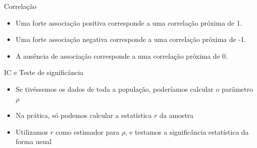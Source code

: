 \documentclass{beamer}
\begin{document}

\begin{frame}{Correlação}
  \begin{block}{}
    \begin{itemize}
    \item Uma forte associação \alert<2>{positiva} corresponde a uma correlação
      próxima de \alert<2>{1}.
    \item Uma forte associação \alert<3>{negativa} corresponde a uma correlação
      próxima de \alert<3>{-1}.
    \item A \alert<4>{ausência} de associação corresponde a uma
      correlação próxima de \alert<4>{0}.
    \end{itemize}
  \end{block}
\end{frame}

\begin{frame}{IC e Teste de significância}
  \begin{itemize}
  \item Se tivéssemos os dados de toda a \alert<1>{população}, poderíamos
    calcular o \alert<1>{parâmetro} $\rho$
  \item Na prática, só podemos calcular a \alert<2>{estatística} $r$ da \alert<2>{amostra}
  \item Utilizamos $r$ como estimador para $\rho$, e testamos a
    significância estatística da forma usual
  \end{itemize}
\end{frame}
\end{document}
